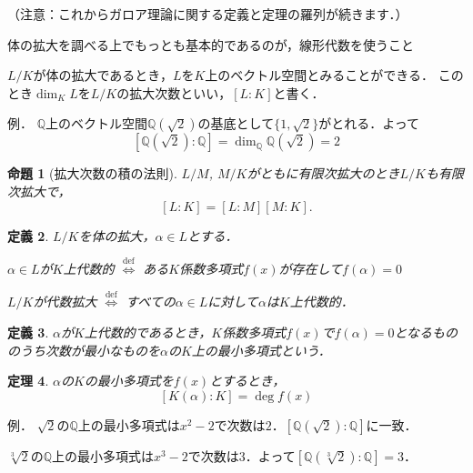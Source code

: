 \documentclass[dvipdfmx,17pt]{beamer}
\theoremstyle{plain}
\newtheorem{thm}{定理}
\newtheorem{defi}[thm]{定義}
\newtheorem{prop}[thm]{命題}
\newcommand{\Q}{\mathbb{Q}}
\begin{document}
\begin{frame}
（注意：これからガロア理論に関する定義と定理の羅列が続きます．）
\end{frame}

\begin{frame}
体の拡大を調べる上でもっとも基本的であるのが，線形代数を使うこと

$L/K$が体の拡大であるとき，$L$を$K$上のベクトル空間とみることができる．
このとき$\dim_K L$を$L/K$の拡大次数といい，$[L:K]$と書く．
\end{frame}

\begin{frame}
例． $\Q$上のベクトル空間$\Q(\sqrt{2})$の基底として$\{1, \sqrt{2}\}$がとれる．よって
\[ [\Q(\sqrt{2}):\Q] = \dim_\Q \Q(\sqrt{2}) = 2 \]
\end{frame}

\begin{frame}
\begin{prop}[拡大次数の積の法則]
$L/M$, $M/K$がともに有限次拡大のとき$L/K$も有限次拡大で，
\[ [L:K] = [L:M][M:K]. \]
\end{prop}
\end{frame}

\begin{frame}
\begin{defi}
$L/K$を体の拡大，$\alpha \in L$とする．

$\alpha \in L$が$K$上代数的 $\overset{\mathrm{def}}{\iff}$ ある$K$係数多項式$f(x)$が存在して$f(\alpha) = 0$

$L/K$が代数拡大 $\overset{\mathrm{def}}{\iff}$ すべての$\alpha \in L$に対して$\alpha$は$K$上代数的．
\end{defi}
\end{frame}

\begin{frame}
\begin{defi}
$\alpha$が$K$上代数的であるとき，$K$係数多項式$f(x)$で$f(\alpha) = 0$となるもののうち次数が最小なものを$\alpha$の$K$上の最小多項式という．
\end{defi}
\end{frame}

\begin{frame}
\begin{thm}
$\alpha$の$K$の最小多項式を$f(x)$とするとき，
\[ [K(\alpha) : K] = \deg f(x) \]
\end{thm}
\end{frame}

\begin{frame}
例． $\sqrt{2}$の$\Q$上の最小多項式は$x^2-2$で次数は$2$．$[\Q(\sqrt{2}):\Q]$に一致．

$\sqrt[3]{2}$の$\Q$上の最小多項式は$x^3-2$で次数は$3$．よって$[\Q(\sqrt[3]{2}):\Q] = 3$．
\end{frame}
\end{document}
